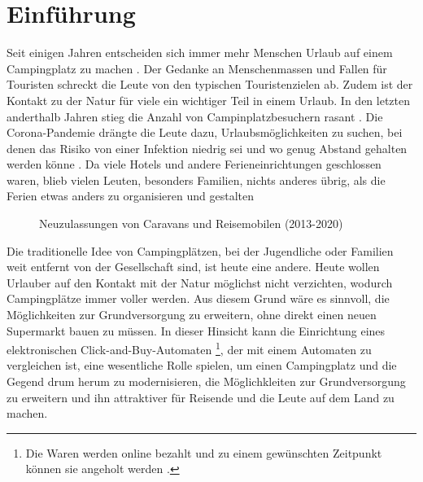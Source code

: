 \section{Einführung}


Seit einigen Jahren entscheiden sich immer mehr Menschen Urlaub auf einem Campingplatz zu machen 
\cite{periodical:ANST}. Der Gedanke an Menschenmassen und Fallen für Touristen schreckt die Leute von 
den typischen Touristenzielen ab. Zudem ist der Kontakt zu der Natur für viele ein wichtiger Teil 
in einem Urlaub. In den letzten anderthalb Jahren stieg die Anzahl von Campinplatzbesuchern rasant
\cite{periodical:UBST}. Die Corona-Pandemie drängte die Leute dazu, Urlaubsmöglichkeiten zu suchen, 
bei denen das Risiko von einer Infektion niedrig sei und wo genug Abstand gehalten werden könne
\cite{periodical:AUST}. Da viele Hotels und andere Ferieneinrichtungen geschlossen waren, blieb 
vielen Leuten, besonders Familien, nichts anderes übrig, als die Ferien etwas anders zu organisieren 
und gestalten 

\vfill
\begin{figure}[H]
    \caption{Neuzulassungen von Caravans und Reisemobilen (2013-2020) \cite{periodical:UBST}}
    \label{fig:periodical_ANST}
\end{figure}

Die traditionelle Idee von Campingplätzen, bei der Jugendliche oder Familien weit entfernt von der 
Gesellschaft sind, ist heute eine andere. Heute wollen Urlauber auf den Kontakt mit der Natur
möglichst nicht verzichten, wodurch Campingplätze immer voller werden. Aus diesem Grund wäre es
sinnvoll, die Möglichkeiten zur Grundversorgung zu erweitern, ohne direkt einen neuen Supermarkt
bauen zu müssen. In dieser Hinsicht kann die Einrichtung eines elektronischen Click-and-Buy-Automaten
\footnote{Die Waren werden online bezahlt und zu einem gewünschten Zeitpunkt können sie angeholt
werden \cite{refart:ECPG}.}, der mit einem Automaten zu vergleichen ist, eine wesentliche Rolle 
spielen, um einen Campingplatz und die Gegend drum herum zu modernisieren, die Möglichkleiten 
zur Grundversorgung zu erweitern und ihn attraktiver für Reisende und die Leute auf dem Land zu machen.

